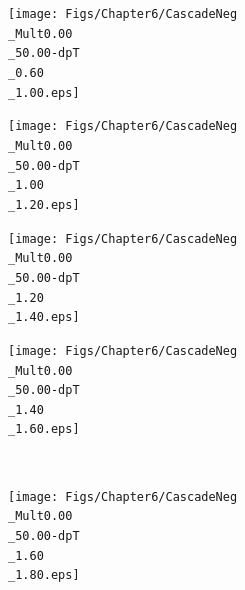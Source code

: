\begin{landscape}
\begin{figure}[h]
	\begin{minipage}[t]{.25\textwidth}
        \hspace*{-2.5cm}
        \texttt{[image: Figs/Chapter6/CascadeNeg\\\_Mult0.00\\\_50.00-dpT\\\_0.60\\\_1.00.eps]}
    \end{minipage}
    \hfill
    \begin{minipage}[t]{.25\textwidth}
        \hspace*{-2.5cm}
        \texttt{[image: Figs/Chapter6/CascadeNeg\\\_Mult0.00\\\_50.00-dpT\\\_1.00\\\_1.20.eps]}
    \end{minipage}
    \hfill
    \begin{minipage}[t]{.25\textwidth}
		\hspace*{-2.5cm}
        \texttt{[image: Figs/Chapter6/CascadeNeg\\\_Mult0.00\\\_50.00-dpT\\\_1.20\\\_1.40.eps]}
    \end{minipage}
    \hfill
    \begin{minipage}[t]{.25\textwidth}
		\hspace*{-2.5cm}
        \texttt{[image: Figs/Chapter6/CascadeNeg\\\_Mult0.00\\\_50.00-dpT\\\_1.40\\\_1.60.eps]}
    \end{minipage}  \\
    \begin{minipage}[t]{.25\textwidth}
        \hspace*{-2.5cm}
        \texttt{[image: Figs/Chapter6/CascadeNeg\\\_Mult0.00\\\_50.00-dpT\\\_1.60\\\_1.80.eps]}
    \end{minipage}
    \hfill
    \begin{minipage}[t]{.25\textwidth}
        \hspace*{-2.5cm}

\end{minipage}
\end{figure}
\end{landscape}
